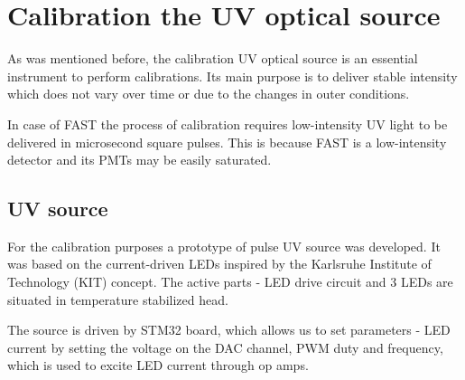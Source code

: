 
\chapter{Calibration the UV optical source}
 \label{chap4}
As was mentioned before, the calibration UV optical source is an essential instrument to perform calibrations. Its main purpose is to deliver stable intensity which does not vary over time or due to the changes in outer conditions.
\par
In case of FAST the process of calibration requires low-intensity UV light to be delivered in microsecond square pulses. This is because FAST is a low-intensity detector and its PMTs may be easily saturated.

\section{UV source}
For the calibration purposes a prototype of pulse UV source was developed. It was based on the current-driven LEDs inspired by the Karlsruhe Institute of Technology (KIT) concept. The active parts - LED drive circuit and 3 LEDs are situated in temperature stabilized head. 
\par
The source is driven by STM32 board, which allows us to set parameters - LED current by setting the voltage on the DAC channel, PWM duty and frequency, which is used to excite LED current through op amps.
 


